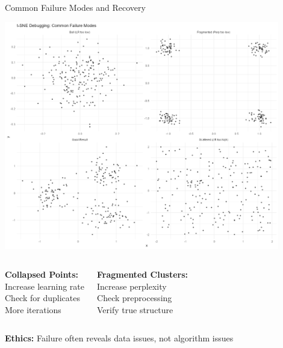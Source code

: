 \documentclass[aspectratio=169]{beamer}
\newcommand{\ethics}[1]{\colorbox{purple!10}{\textcolor{ethicscolor}{\textbf{Ethics:} #1}}}
\begin{document}
\begin{frame}{Common Failure Modes and Recovery}
\begin{center}
\includegraphics[width=0.9\textwidth]{./Figures/failure_modes_gallery.png}
\end{center}

\begin{columns}
\textbf{Collapsed Points:}\\
Increase learning rate\\
Check for duplicates\\
More iterations

\textbf{Fragmented Clusters:}\\
Increase perplexity\\
Check preprocessing\\
Verify true structure
\end{columns}

\ethics{Failure often reveals data issues, not algorithm issues}
\end{frame}
\end{document}
